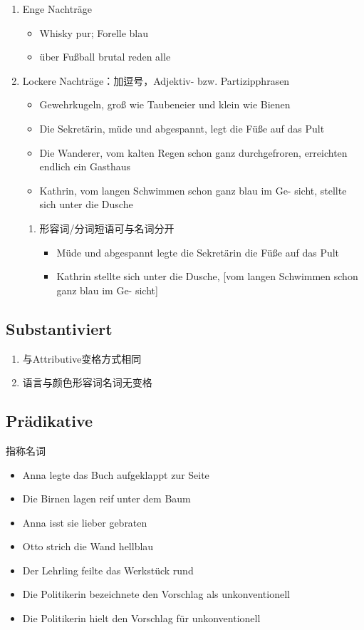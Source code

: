 \documentclass[UTF8]{report}
\begin{document}
\begin{enumerate}
    \item Enge Nachträge
    \begin{itemize}
        \item Whisky pur; Forelle blau
        \item über Fußball brutal reden alle
    \end{itemize}
    \item Lockere Nachträge：加逗号，Adjektiv- bzw. Partizipphrasen
    \begin{itemize}
        \item Gewehrkugeln, groß wie Taubeneier und klein wie Bienen
        \item Die Sekretärin, müde und abgespannt, legt die Füße auf das Pult
        \item Die Wanderer, vom kalten Regen schon ganz durchgefroren, erreichten endlich ein Gasthaus
        \item Kathrin, vom langen Schwimmen schon ganz blau im Ge- sicht, stellte sich unter die Dusche
    \end{itemize}
    \begin{enumerate}
        \item 形容词/分词短语可与名词分开
        \begin{itemize}
            \item Müde und abgespannt legte die Sekretärin die Füße auf das Pult
            \item Kathrin stellte sich unter die Dusche, [vom langen Schwimmen schon ganz blau im Ge- sicht]
        \end{itemize}
    \end{enumerate}
\end{enumerate}



\subsection{Substantiviert}
\begin{enumerate}
    \item 与Attributive变格方式相同
    \item 语言与颜色形容词名词无变格
\end{enumerate}


\subsection{Prädikative}
指称名词
\begin{itemize}
    \item Anna legte das Buch aufgeklappt zur Seite
    \item Die Birnen lagen reif unter dem Baum
    \item Anna isst sie lieber gebraten
    \item Otto strich die Wand hellblau
    \item Der Lehrling feilte das Werkstück rund
    \item Die Politikerin bezeichnete den Vorschlag als unkonventionell
    \item Die Politikerin hielt den Vorschlag für unkonventionell
\end{itemize}
\end{document}
